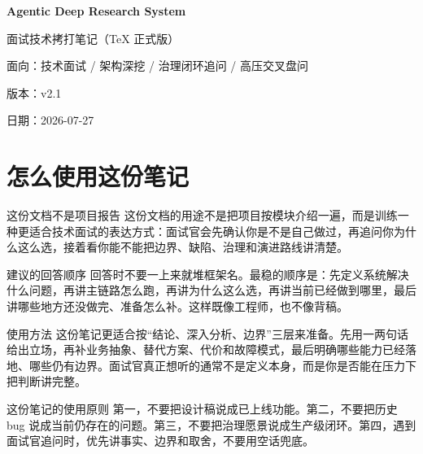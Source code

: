 \documentclass[12pt]{article}
\begin{document}

\begin{titlepage}
  \centering
  \vspace*{3cm}
  {\Huge\bfseries Agentic Deep Research System\par}
  \vspace{0.8cm}
  {\LARGE 面试技术拷打笔记（TeX 正式版）\par}
  \vspace{1.2cm}
  {\large 面向：技术面试 / 架构深挖 / 治理闭环追问 / 高压交叉盘问\par}
  \vfill
  {\large 版本：v2.1\par}
  {\large 日期：2026-07-27\par}
\end{titlepage}

\clearpage
\setcounter{page}{2}
\tableofcontents
\clearpage
{}

\section{怎么使用这份笔记}

\begin{summaryBox}{这份文档不是项目报告}
这份文档的用途不是把项目按模块介绍一遍，而是训练一种更适合技术面试的表达方式：面试官会先确认你是不是自己做过，再追问你为什么这么选，接着看你能不能把边界、缺陷、治理和演进路线讲清楚。
\end{summaryBox}

\begin{qaBox}{建议的回答顺序}
回答时不要一上来就堆框架名。最稳的顺序是：先定义系统解决什么问题，再讲主链路怎么跑，再讲为什么这么选，再讲当前已经做到哪里，最后讲哪些地方还没做完、准备怎么补。这样既像工程师，也不像背稿。
\end{qaBox}

\begin{analysisBox}{使用方法}
这份笔记更适合按“结论、深入分析、边界”三层来准备。先用一两句话给出立场，再补业务抽象、替代方案、代价和故障模式，最后明确哪些能力已经落地、哪些仍有边界。面试官真正想听的通常不是定义本身，而是你是否能在压力下把判断讲完整。
\end{analysisBox}

\begin{riskBox}{这份笔记的使用原则}
第一，不要把设计稿说成已上线功能。第二，不要把历史 bug 说成当前仍存在的问题。第三，不要把治理愿景说成生产级闭环。第四，遇到面试官追问时，优先讲事实、边界和取舍，不要用空话兜底。
\end{riskBox}
\end{document}

